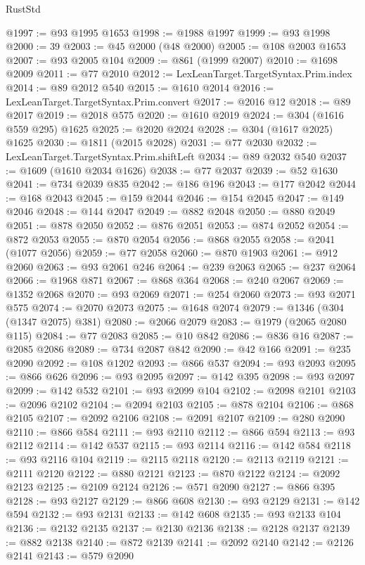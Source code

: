 \begin{lexlean}{RustStd}
\begin{coremodule}
@1997 := @93 @1995 @1653
@1998 := @1988 @1997
@1999 := @93 @1998
@2000 := 39
@2003 := @45 @2000 (@48 @2000)
@2005 := @108 @2003 @1653
@2007 := @93 @2005 @104
@2009 := @861 (@1999 @2007)
@2010 := @1698 @2009
@2011 := @77 @2010
@2012 := LexLeanTarget.TargetSyntax.Prim.index
@2014 := @89 @2012 @540
@2015 := @1610 @2014
@2016 := LexLeanTarget.TargetSyntax.Prim.convert
@2017 := @2016 @12
@2018 := @89 @2017
@2019 := @2018 @575
@2020 := @1610 @2019
@2024 := @304 (@1616 @559 @295) @1625
@2025 := @2020 @2024
@2028 := @304 (@1617 @2025) @1625
@2030 := @1811 (@2015 @2028)
@2031 := @77 @2030
@2032 := LexLeanTarget.TargetSyntax.Prim.shiftLeft
@2034 := @89 @2032 @540
@2037 := @1609 (@1610 @2034 @1626)
@2038 := @77 @2037
@2039 := @52 @1630
@2041 := @734 @2039 @835
@2042 := @186 @196
@2043 := @177 @2042
@2044 := @168 @2043
@2045 := @159 @2044
@2046 := @154 @2045
@2047 := @149 @2046
@2048 := @144 @2047
@2049 := @882 @2048
@2050 := @880 @2049
@2051 := @878 @2050
@2052 := @876 @2051
@2053 := @874 @2052
@2054 := @872 @2053
@2055 := @870 @2054
@2056 := @868 @2055
@2058 := @2041 (@1077 @2056)
@2059 := @77 @2058
@2060 := @870 @1903
@2061 := @912 @2060
@2063 := @93 @2061 @246
@2064 := @239 @2063
@2065 := @237 @2064
@2066 := @1968 @871
@2067 := @868 @364
@2068 := @240 @2067
@2069 := @1352 @2068
@2070 := @93 @2069
@2071 := @254 @2060
@2073 := @93 @2071 @575
@2074 := @2070 @2073
@2075 := @1648 @2074
@2079 := @1346 (@304 (@1347 @2075) @381)
@2080 := @2066 @2079
@2083 := @1979 (@2065 @2080 @115)
@2084 := @77 @2083
@2085 := @10 @842
@2086 := @836 @16
@2087 := @2085 @2086
@2089 := @734 @2087 @842
@2090 := @42 @166
@2091 := @235 @2090
@2092 := @108 @1202
@2093 := @866 @537
@2094 := @93 @2093
@2095 := @866 @626
@2096 := @93 @2095
@2097 := @142 @395
@2098 := @93 @2097
@2099 := @142 @532
@2101 := @93 @2099 @104
@2102 := @2098 @2101
@2103 := @2096 @2102
@2104 := @2094 @2103
@2105 := @878 @2104
@2106 := @868 @2105
@2107 := @2092 @2106
@2108 := @2091 @2107
@2109 := @280 @2090
@2110 := @866 @584
@2111 := @93 @2110
@2112 := @866 @594
@2113 := @93 @2112
@2114 := @142 @537
@2115 := @93 @2114
@2116 := @142 @584
@2118 := @93 @2116 @104
@2119 := @2115 @2118
@2120 := @2113 @2119
@2121 := @2111 @2120
@2122 := @880 @2121
@2123 := @870 @2122
@2124 := @2092 @2123
@2125 := @2109 @2124
@2126 := @571 @2090
@2127 := @866 @395
@2128 := @93 @2127
@2129 := @866 @608
@2130 := @93 @2129
@2131 := @142 @594
@2132 := @93 @2131
@2133 := @142 @608
@2135 := @93 @2133 @104
@2136 := @2132 @2135
@2137 := @2130 @2136
@2138 := @2128 @2137
@2139 := @882 @2138
@2140 := @872 @2139
@2141 := @2092 @2140
@2142 := @2126 @2141
@2143 := @579 @2090

\end{coremodule}
\end{lexlean}

